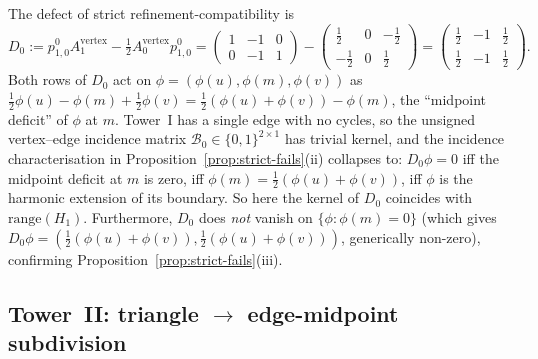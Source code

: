 \documentclass[11pt]{article}
\theoremstyle{plain}
\theoremstyle{definition}
\theoremstyle{remark}
\begin{document}
The defect of strict refinement-compatibility is
\[
   D_0
   := p^{0}_{1, 0} A_1^{\mathrm{vertex}} - \tfrac12 A_0^{\mathrm{vertex}} p^{0}_{1, 0}
   = \begin{pmatrix} 1 & -1 & 0 \\ 0 & -1 & 1 \end{pmatrix}
   - \begin{pmatrix} \tfrac12 & 0 & -\tfrac12 \\ -\tfrac12 & 0 & \tfrac12 \end{pmatrix}
   = \begin{pmatrix} \tfrac12 & -1 & \tfrac12 \\ \tfrac12 & -1 & \tfrac12 \end{pmatrix}.
\]
Both rows of $D_0$ act on $\phi = (\phi(u), \phi(m), \phi(v))$ as
$\tfrac12 \phi(u) - \phi(m) + \tfrac12 \phi(v) =
\tfrac12 (\phi(u) + \phi(v)) - \phi(m)$, the ``midpoint deficit''
of $\phi$ at $m$. Tower~I has a single edge with no cycles, so
the unsigned vertex--edge incidence matrix
$\mathcal{B}_0 \in \{0, 1\}^{2 \times 1}$ has trivial kernel, and the
incidence characterisation in
Proposition~\ref{prop:strict-fails}(ii) collapses to: $D_0 \phi = 0$
iff the midpoint deficit at $m$ is zero, iff
$\phi(m) = \tfrac12 (\phi(u) + \phi(v))$, iff $\phi$ is the harmonic
extension of its boundary. So here the kernel of $D_0$
coincides with $\mathrm{range}(H_1)$. Furthermore, $D_0$ does
\emph{not} vanish on $\{\phi : \phi(m) = 0\}$ (which gives
$D_0 \phi = (\tfrac12 (\phi(u) + \phi(v)),
\tfrac12 (\phi(u) + \phi(v)))$, generically non-zero), confirming
Proposition~\ref{prop:strict-fails}(iii).

\subsection{Tower~II: triangle $\to$ edge-midpoint subdivision}
\end{document}
